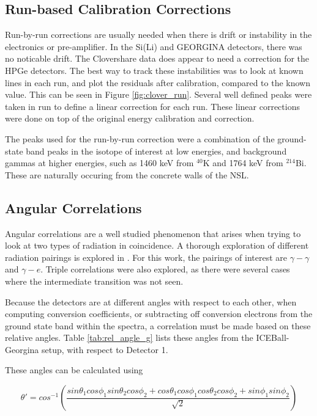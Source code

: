 \subsection{Run-based Calibration Corrections}

Run-by-run corrections are usually needed when there is drift or instability in the electronics or pre-amplifier. In the Si(Li) and GEORGINA detectors, there was no noticable drift. The Clovershare data does appear to need a correction for the HPGe detectors. The best way to track these instabilities was to look at known lines in each run, and plot the residuals after calibration, compared to the known value. This can be seen in Figure \ref{fig:clover_run}.  Several well defined peaks were taken in run to define a linear correction for each run. These linear corrections were done on top of the original energy calibration and correction.



The peaks used for the run-by-run correction were a combination of the ground-state band peaks in the isotope of interest at low energies, and background gammas at higher energies, such as 1460 keV from $^{40}$K and 1764 keV from $^{214}$Bi. These are naturally occuring from the concrete walls of the NSL.

\subsection{Angular Correlations}

Angular correlations are a well studied phenomenon that arises when trying to look at two types of radiation in coincidence. A thorough exploration of different radiation pairings is explored in \citep{biedenharn53:_theory_angular_corr}. For this work, the pairings of interest are $\gamma-\gamma$ and $\gamma-e$. Triple correlations were also explored, as there were several cases where the intermediate transition was not seen.

Because the detectors are at different angles with respect to each other, when computing conversion coefficients, or subtracting off conversion electrons from the ground state band within the spectra, a correlation must be made based on these relative angles. Table \ref{tab:rel_angle_g} lists these angles from the ICEBall-Georgina setup, with respect to Detector 1. 

These angles can be calculated using

\begin{equation}
    \theta ' = cos^{-1}(\frac{sin\theta_1 cos\phi_1 sin\theta_2 cos\phi_2 +cos\theta_1 cos\phi_1 cos\theta_2 cos\phi_2 + sin\phi_1 sin\phi_2}{\sqrt{2}})
    \label{eq:rel_angle}
\end{equation}

